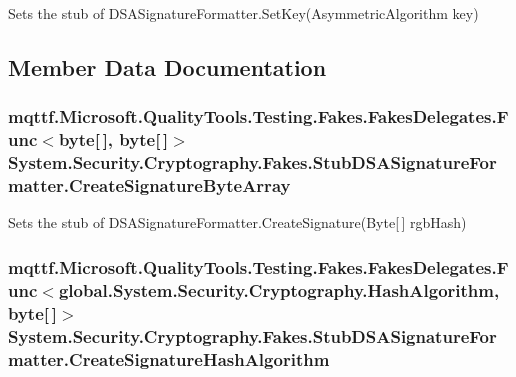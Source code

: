 Sets the stub of D\-S\-A\-Signature\-Formatter.\-Set\-Key(\-Asymmetric\-Algorithm key)



\subsection{Member Data Documentation}
\hypertarget{class_system_1_1_security_1_1_cryptography_1_1_fakes_1_1_stub_d_s_a_signature_formatter_af9979432fa7b12595ab8d7e27f48d834}{
\subsubsection[{Create\-Signature\-Byte\-Array}]{\setlength{\rightskip}{0pt plus 5cm}mqttf.\-Microsoft.\-Quality\-Tools.\-Testing.\-Fakes.\-Fakes\-Delegates.\-Func$<$byte\mbox{[}$\,$\mbox{]}, byte\mbox{[}$\,$\mbox{]}$>$ System.\-Security.\-Cryptography.\-Fakes.\-Stub\-D\-S\-A\-Signature\-Formatter.\-Create\-Signature\-Byte\-Array}}\label{class_system_1_1_security_1_1_cryptography_1_1_fakes_1_1_stub_d_s_a_signature_formatter_af9979432fa7b12595ab8d7e27f48d834}


Sets the stub of D\-S\-A\-Signature\-Formatter.\-Create\-Signature(\-Byte\mbox{[}$\,$\mbox{]} rgb\-Hash)

\hypertarget{class_system_1_1_security_1_1_cryptography_1_1_fakes_1_1_stub_d_s_a_signature_formatter_a277069232ec2ec4d04f5f180b3402222}{
\subsubsection[{Create\-Signature\-Hash\-Algorithm}]{\setlength{\rightskip}{0pt plus 5cm}mqttf.\-Microsoft.\-Quality\-Tools.\-Testing.\-Fakes.\-Fakes\-Delegates.\-Func$<$global.\-System.\-Security.\-Cryptography.\-Hash\-Algorithm, byte\mbox{[}$\,$\mbox{]}$>$ System.\-Security.\-Cryptography.\-Fakes.\-Stub\-D\-S\-A\-Signature\-Formatter.\-Create\-Signature\-Hash\-Algorithm}}\label{class_system_1_1_security_1_1_cryptography_1_1_fakes_1_1_stub_d_s_a_signature_formatter_a277069232ec2ec4d04f5f180b3402222}


